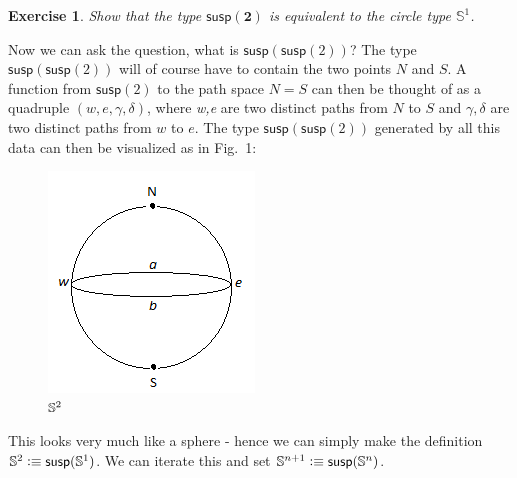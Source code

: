 \documentclass[11pt]{article}
\newcommand{\two}{\mathbf{2}}
\newcommand{\Sphere}[1]{\mathbb{S}^#1}
\newcommand{\susp}{\ensuremath{\mathsf{susp}}\xspace}
\newtheorem*{exercise}{Exercise}
\begin{document}
\begin{exercise}
Show that the type $\susp(\two)$ is equivalent to the circle type $\Sphere{1}$.
\end{exercise}

Now we can ask the question, what is $\susp(\susp(2))$? The type $\susp(\susp(2))$ will of course have to contain the two points $N$ and $S$. A function from $\susp(2)$ to the path space $N = S$ can then be thought of as a quadruple $(w, e, \gamma, \delta)$, where \emph{w,e} are two distinct paths from $N$ to $S$ and $\gamma,\delta$ are two distinct paths from $w$ to $e$. The type $\susp(\susp(2))$ generated by all this data can then be visualized as in Fig.~1:
\begin{figure}[t]
\centering
\includegraphics[scale=0.5]{sphere.png}
\caption{$\mathbb{S}^{2}$}
\end{figure}

This looks very much like a sphere - hence we can simply make the definition $\Sphere{2} \defeq \susp(\Sphere{1})$. We can iterate this and set $\Sphere{{n+1}} \defeq \susp(\Sphere{n})$.
\end{document}

